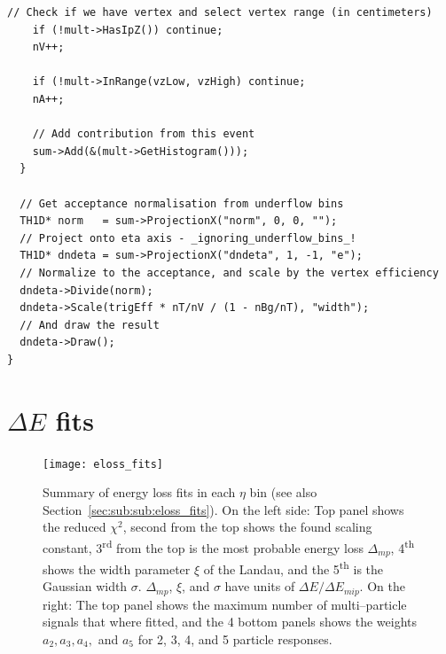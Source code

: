 \documentclass[11pt]{article}
\newcommand{\mult}[1][]{\ensuremath N_{\text{ch}#1}}
\newcommand{\dndeta}[1][]{{\ensuremath%
    \ifx|#1|\else\left.\fi%
    \frac{1}{N}\frac{d\mult{}}{d\eta}%
    \ifx|#1|\else\right|_{#1}\fi%
}}
\newcommand{\secref}[1]{Section~\ref{#1}}
\begin{document}
\begin{lstlisting}[caption={Example 2\textsuperscript{nd} pass code to
    do $\dndeta$},label={lst:example},frame=single,captionpos=b]
    // Check if we have vertex and select vertex range (in centimeters) 
    if (!mult->HasIpZ()) continue;
    nV++;
    
    if (!mult->InRange(vzLow, vzHigh) continue; 
    nA++;

    // Add contribution from this event
    sum->Add(&(mult->GetHistogram()));
  }

  // Get acceptance normalisation from underflow bins 
  TH1D* norm   = sum->ProjectionX("norm", 0, 0, "");
  // Project onto eta axis - _ignoring_underflow_bins_!
  TH1D* dndeta = sum->ProjectionX("dndeta", 1, -1, "e");
  // Normalize to the acceptance, and scale by the vertex efficiency 
  dndeta->Divide(norm);
  dndeta->Scale(trigEff * nT/nV / (1 - nBg/nT), "width");
  // And draw the result
  dndeta->Draw();
}
\end{lstlisting}

\section{$\Delta E$ fits} 
\label{app:eloss_fits}

\begin{figure}[htbp]
  \centering
  \texttt{[image: eloss\_fits]}
  \caption{Summary of energy loss fits in each $\eta$ bin (see also
    \secref{sec:sub:sub:eloss_fits}).
    \newline
    On the left side: Top panel shows the
    reduced $\chi^2$, second from the top shows the found
    scaling constant, 3\textsuperscript{rd} from the top is
    the most probable energy loss $\Delta_{mp}$, 4\textsuperscript{th}
    shows the width parameter $\xi$ of the Landau, and the
    5\textsuperscript{th} is the Gaussian width $\sigma$.
    $\Delta_{mp}$, $\xi$, and $\sigma$ have units of $\Delta E/\Delta
    E_{mip}$. 
    \newline
    On the right: The top panel shows the maximum number of
    multi--particle signals that where fitted, and the 4 bottom panels
    shows the weights $a_2,a_3,a_4,$ and $a_5$ for 2, 3, 4, and 5
    particle responses.}
  \label{fig:eloss_fits}
\end{figure}
\end{document}
